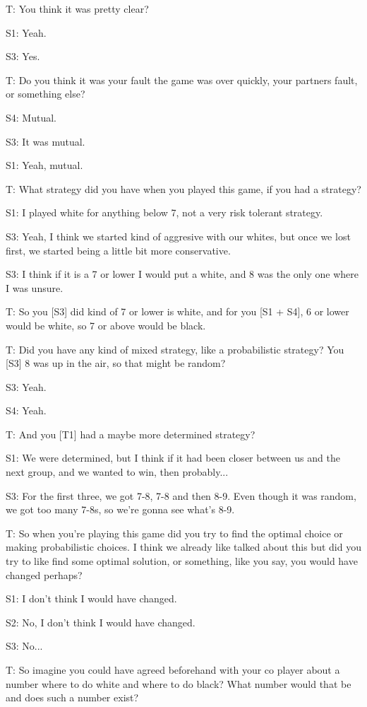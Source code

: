 \documentclass[a4paper,superscriptaddress,nofootinbib]{revtex4}
\begin{document}
T: You think it was pretty clear?

S1: Yeah.

S3: Yes.

T: Do you think it was your fault the game was over quickly, your partners fault, or something else?

S4: Mutual.

S3: It was mutual.

S1: Yeah, mutual.

T: What strategy did you have when you played this game, if you had a strategy?

S1: I played white for anything below 7, not a very risk tolerant strategy.

S3: Yeah, I think we started kind of aggresive with our whites, but once we lost first, we started being a little bit more conservative.

S3: I think if it is a 7 or lower I would put a white, and 8 was the only one where I was unsure.

T: So you [S3] did kind of 7 or lower is white, and for you [S1 + S4], 6 or lower would be white, so 7 or above would be black.

T: Did you have any kind of mixed strategy, like a probabilistic strategy? You [S3] 8 was up in the air, so that might be random?

S3: Yeah.

S4: Yeah.

T: And you [T1] had a maybe more determined strategy?

S1: We were determined, but I think if it had been closer between us and the next group, and we wanted to win, then probably...

S3: For the first three, we got 7-8, 7-8 and then 8-9. Even though it was random, we got too many 7-8s, so we're gonna see what's 8-9.

T: So when you're playing this game did you try to find the optimal choice or making probabilistic choices. I think we already like talked about this but did you try to like find some optimal solution, or something, like you say, you would have changed perhaps?

S1: I don't think I would have changed.

S2: No, I don't think I would have changed.

S3: No...

T: So imagine you could have agreed beforehand with your co player about a number where to do white and where to do black? What number would that be and does such a number exist?
\end{document}
